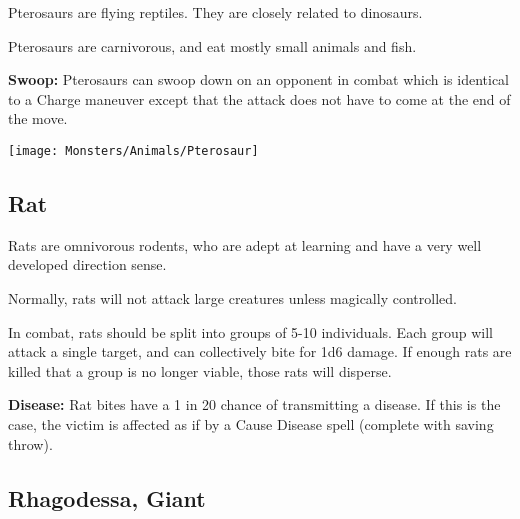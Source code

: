 \begin{multicols*}{2}
Pterosaurs are flying reptiles. They are closely related to dinosaurs.

Pterosaurs are carnivorous, and eat mostly small animals and fish.

\textbf{Swoop:} Pterosaurs can swoop down on an opponent in combat which is identical to a Charge maneuver except that the attack does not have to come at the end of the move.

\texttt{[image: Monsters/Animals/Pterosaur]}

\subsection{Rat}

Rats are omnivorous rodents, who are adept at learning and have a very well developed direction sense.

Normally, rats will not attack large creatures unless magically controlled.

In combat, rats should be split into groups of 5-10 individuals. Each group will attack a single target, and can collectively bite for 1d6 damage. If enough rats are killed that a group is no longer viable, those rats will disperse.

\textbf{Disease:} Rat bites have a 1 in 20 chance of transmitting a disease. If this is the case, the victim is affected as if by a Cause Disease spell (complete with saving throw).

\subsection{Rhagodessa, Giant}
\end{multicols*}

